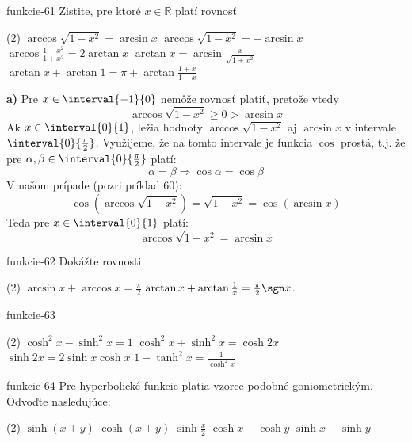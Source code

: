 \begin{defproblem}{funkcie-61}
Zistite, pre ktoré $x\in\mathbb{R}$ platí rovnosť
\begin{tasks}(2)
  \task $\arccos\sqrt{1-x^2}=\arcsin x$
  \task $\arccos\sqrt{1-x^2}=-\arcsin x$
  \task $\arccos\frac{1-x^2}{1+x^2}=2\arctan x$
  \task $\arctan x=\arcsin\frac{x}{\sqrt{1+x^2}}$
  \task $\arctan x +\arctan 1 =\pi+ \arctan\frac{1+x}{1-x}$
\end{tasks}

\begin{solution}
  \textbf{a)}
  Pre $x \in \interval{-1}{0}$ nemôže rovnosť platiť, pretože vtedy
  \[
    \arccos\sqrt{1-x^2} \geq 0 > \arcsin{x}
  \]
  Ak $x \in \interval{0}{1}$, ležia hodnoty $\arccos{\sqrt{1-x^2}}$ aj
  $\arcsin{x}$ v intervale $\interval{0}{\frac{\pi}{2}}$. Využijeme, že na tomto
  intervale je funkcia $\cos$ prostá, t.j. že pre $\alpha,\beta \in
  \interval{0}{\frac{\pi}{2}}$ platí:
  \[
    \alpha = \beta \Rightarrow \cos{\alpha} = \cos{\beta}
  \]
  V našom prípade (pozri príklad $60$):
  \[
    \cos(\arccos\sqrt{1-x^2})=\sqrt{1-x^2}=\cos(\arcsin x)
  \]
  Teda pre $x \in \interval{0}{1}$ platí:
  \[
    \arccos{\sqrt{1-x^2}}=\arcsin x
  \]
\end{solution}
\end{defproblem}

\begin{defproblem}{funkcie-62}
Dokážte rovnosti
\begin{tasks}(2)
  \task $\arcsin x +\arccos x =\frac{\pi}{2}$
  \task $\arctan x +\arctan\frac{1}{x}=\frac{\pi}{2}\sgn x$.
\end{tasks}
\end{defproblem}

\begin{defproblem}{funkcie-63}
\begin{tasks}(2)
  \task $\cosh^2x - \sinh^2x=1$
  \task $\cosh^2x + \sinh^2x=\cosh 2x$
  \task $\sinh 2x = 2\sinh x \cosh x$
  \task $1 - \tanh^2x = \frac{1}{\cosh^2x}$
\end{tasks}
\end{defproblem}

\begin{defproblem}{funkcie-64}
Pre hyperbolické funkcie platia vzorce podobné goniometrickým. Odvoďte nasledujúce:
\begin{tasks}(2)
  \task $\sinh(x+y)$
  \task $\cosh(x+y)$
  \task $\sinh\frac{x}{2}$
  \task $\cosh x + \cosh y$
  \task $\sinh x - \sinh y$
\end{tasks}
\end{defproblem}

